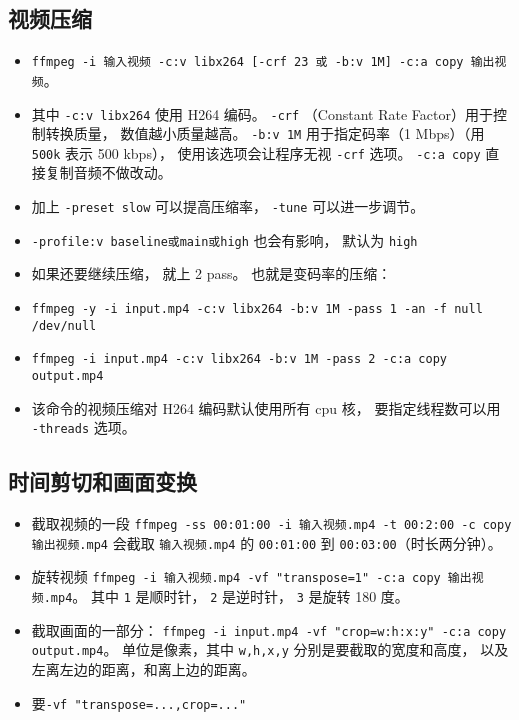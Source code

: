 \subsection{视频压缩}
\begin{itemize}
\item \verb`ffmpeg -i 输入视频 -c:v libx264 [-crf 23 或 -b:v 1M] -c:a copy 输出视频`。
\item 其中 \verb`-c:v libx264` 使用 H264 编码。 \verb`-crf` （Constant Rate Factor）用于控制转换质量， 数值越小质量越高。 \verb`-b:v 1M` 用于指定码率（1 Mbps）（用 \verb`500k` 表示 500 kbps）， 使用该选项会让程序无视 \verb`-crf` 选项。 \verb`-c:a copy` 直接复制音频不做改动。
\item 加上 \verb`-preset slow` 可以提高压缩率， \verb`-tune` 可以进一步调节。
\item \verb`-profile:v baseline或main或high` 也会有影响， 默认为 \verb`high`
\item 如果还要继续压缩， 就上 2 pass。 也就是变码率的压缩：
\item \verb`ffmpeg -y -i input.mp4 -c:v libx264 -b:v 1M -pass 1 -an -f null /dev/null`
\item \verb`ffmpeg -i input.mp4 -c:v libx264 -b:v 1M -pass 2 -c:a copy output.mp4`
\item 该命令的视频压缩对 H264 编码默认使用所有 cpu 核， 要指定线程数可以用 \verb`-threads` 选项。
\end{itemize}

\subsection{时间剪切和画面变换}
\begin{itemize}
\item 截取视频的一段 \verb`ffmpeg -ss 00:01:00 -i 输入视频.mp4 -t 00:2:00 -c copy 输出视频.mp4` 会截取 \verb`输入视频.mp4` 的 \verb`00:01:00` 到 \verb`00:03:00`（时长两分钟）。
\item 旋转视频 \verb`ffmpeg -i 输入视频.mp4 -vf "transpose=1" -c:a copy 输出视频.mp4`。 其中 \verb`1` 是顺时针， \verb`2` 是逆时针， \verb`3` 是旋转 180 度。
\item 截取画面的一部分： \verb`ffmpeg -i input.mp4 -vf "crop=w:h:x:y" -c:a copy output.mp4`。 单位是像素，其中 \verb`w,h,x,y` 分别是要截取的宽度和高度， 以及左离左边的距离，和离上边的距离。
\item 要\verb`-vf "transpose=...,crop=..."`
\end{itemize}

